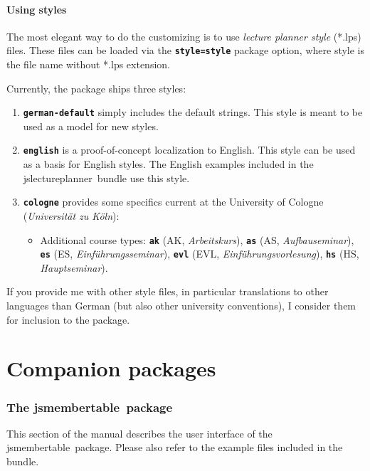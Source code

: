 \documentclass[english]{article}
\newcommand*\joption[1]{\textbf{\texttt{#1}}}
\newcommand*\jparam[1]{\angus #1\angud}
\newcommand*\jslp{\textsf{jslectureplanner}}
\newcommand*\jsmt{\textsf{jsmembertable}}
\begin{document}
\subsection{Using styles}\label{sec:styles}

The most elegant way to do the customizing is to use \emph{lecture planner style} (*.lps) files.
These files can be loaded via the \joption{style=\jparam{style}} package option, where \jparam{style}
is the file name without *.lps extension.

Currently, the package ships three styles:
\begin{enumerate}
  \item \joption{german-default} simply includes the default strings.
     This style is meant to be used as a model for new styles.
  \item \joption{english} is a proof-of-concept localization to English.
     This style can be used as a basis for English styles. The English examples
     included in the \jslp\ bundle use this style.
  \item \joption{cologne} provides some specifics current at the University of Cologne
     (\emph{Universität zu Köln}):
     \begin{itemize}
      \item Additional course types: \joption{ak} (AK, \emph{Arbeitskurs}),
      \joption{as} (AS, \emph{Aufbauseminar}), \joption{es} (ES, \emph{Einführungsseminar}),
      \joption{evl} (EVL, \emph{Einführungsvorlesung}), \joption{hs} (HS, \emph{Hauptseminar}).
     \end{itemize}
     
\end{enumerate}
If you provide me with other style files, in particular
translations to other languages than German (but also other university conventions), I consider
them for inclusion to the package.

\clearpage

\part{Companion packages}

\section{The \jsmt\ package}

This section of the manual describes the user interface of the \jsmt\
package. Please also refer to the example files included in the bundle.
\end{document}
